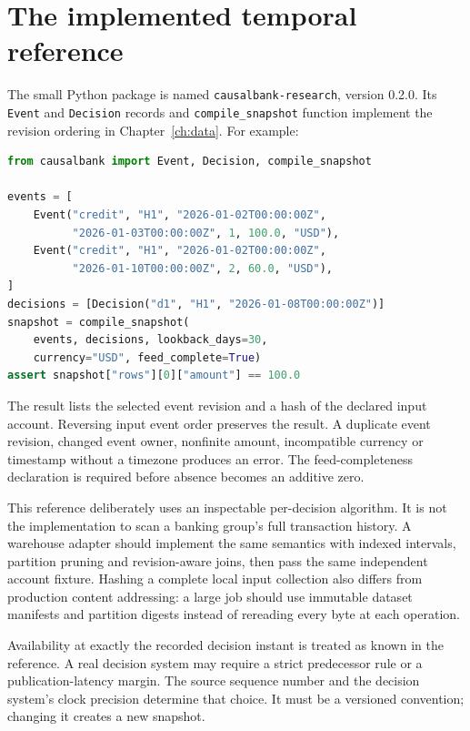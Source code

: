 \section{The implemented temporal reference}
The small Python package is named \texttt{causalbank-research}, version 0.2.0.
Its \texttt{Event} and \texttt{Decision} records and
\texttt{compile\_snapshot} function implement the revision ordering in
Chapter~\ref{ch:data}. For example:
\begin{lstlisting}[language=Python]
from causalbank import Event, Decision, compile_snapshot

events = [
    Event("credit", "H1", "2026-01-02T00:00:00Z",
          "2026-01-03T00:00:00Z", 1, 100.0, "USD"),
    Event("credit", "H1", "2026-01-02T00:00:00Z",
          "2026-01-10T00:00:00Z", 2, 60.0, "USD"),
]
decisions = [Decision("d1", "H1", "2026-01-08T00:00:00Z")]
snapshot = compile_snapshot(
    events, decisions, lookback_days=30,
    currency="USD", feed_complete=True)
assert snapshot["rows"][0]["amount"] == 100.0
\end{lstlisting}
The result lists the selected event revision and a hash of the declared
input account. Reversing input event order preserves the result. A duplicate
event revision, changed event owner, nonfinite amount, incompatible currency
or timestamp without a timezone produces an error. The feed-completeness
declaration is required before absence becomes an additive zero.

This reference deliberately uses an inspectable per-decision algorithm.
It is not the implementation to scan a banking group's full transaction
history. A warehouse adapter should implement the same semantics with
indexed intervals, partition pruning and revision-aware joins, then pass the
same independent account fixture. Hashing a complete local input collection
also differs from production content addressing: a large job should use
immutable dataset manifests and partition digests instead of rereading every
byte at each operation.

Availability at exactly the recorded decision instant is treated as known
in the reference. A real decision system may require a strict predecessor
rule or a publication-latency margin. The source sequence number and the
decision system's clock precision determine that choice. It must be a
versioned convention; changing it creates a new snapshot.


